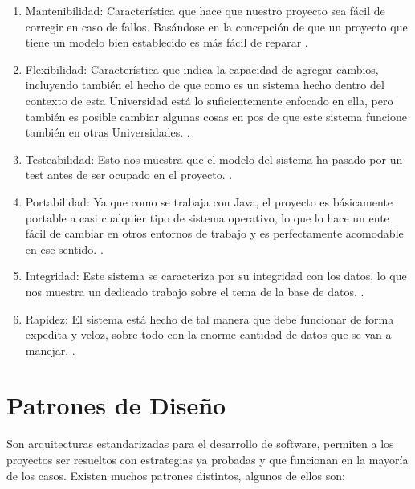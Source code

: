 \documentclass[a4paper,12pt,openany,oneside]{book}
\begin{document}
\begin{enumerate}

\item Mantenibilidad: Característica que hace que nuestro proyecto sea fácil de corregir en caso de fallos. Basándose en la concepción de que un proyecto que tiene un modelo bien establecido es más fácil de reparar \cite{data11}.

\item Flexibilidad: Característica que indica la capacidad de agregar cambios, incluyendo también el hecho de que como es un sistema hecho dentro del contexto de esta Universidad está lo suficientemente enfocado en ella, pero también es posible cambiar algunas cosas en pos de que este sistema funcione también en otras Universidades. \cite{data11}.

\item Testeabilidad: Esto nos muestra que el modelo del sistema ha pasado por un test antes de ser ocupado en el proyecto. \cite{data11}.

\item Portabilidad: Ya que como se trabaja con Java, el proyecto es básicamente portable a casi cualquier tipo de sistema operativo, lo que lo hace un ente fácil de cambiar en otros entornos de trabajo y es perfectamente acomodable en ese sentido. \cite{data11}.

\item Integridad: Este sistema se caracteriza por su integridad con los datos, lo que nos muestra un dedicado trabajo sobre el tema de la base de datos. \cite{data11}.

\item Rapidez: El sistema está hecho de tal manera que debe funcionar de forma expedita y veloz, sobre todo con la enorme cantidad de datos que se van a manejar. \cite{data11}.

\end{enumerate}

\section{Patrones de Diseño}
Son arquitecturas estandarizadas para el desarrollo de software, permiten a los proyectos ser resueltos con estrategias ya probadas y que funcionan en la mayoría de los casos. Existen muchos patrones distintos, algunos de ellos son:
\end{document}
